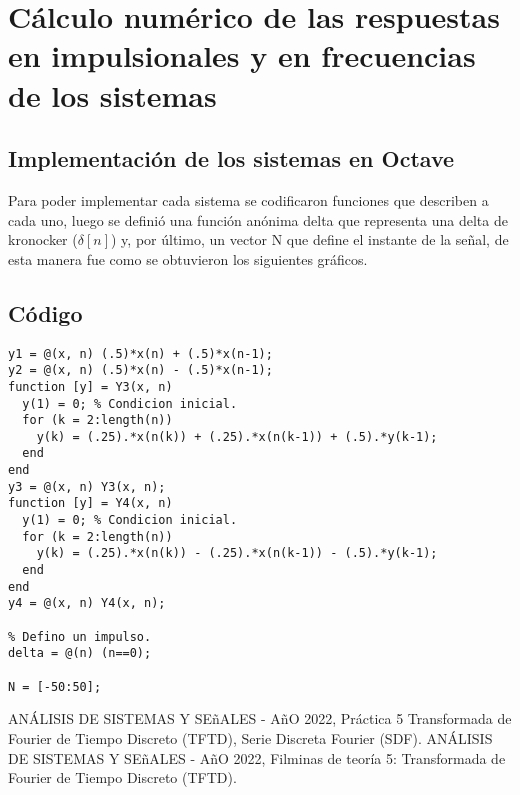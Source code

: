 \documentclass[letterpaper, 10 pt, conference]{ieeeconf}  %
\begin{document}
\section{C\'alculo num\'erico de las respuestas en impulsionales y en frecuencias de los sistemas}
\subsection{Implementaci\'on de los sistemas en Octave}
Para poder implementar cada sistema se codificaron funciones que describen a cada uno, luego se defini\'o una funci\'on an\'onima delta que representa una delta de kronocker ($\delta[n]$) y, por \'ultimo, un vector N que define el instante de la señal, de esta manera fue como se obtuvieron los siguientes gr\'aficos.

\subsection{C\'odigo}
\begin{lstlisting}[style=Matlab-editor]
y1 = @(x, n) (.5)*x(n) + (.5)*x(n-1);
y2 = @(x, n) (.5)*x(n) - (.5)*x(n-1);
function [y] = Y3(x, n)
  y(1) = 0; % Condicion inicial.
  for (k = 2:length(n))
    y(k) = (.25).*x(n(k)) + (.25).*x(n(k-1)) + (.5).*y(k-1);
  end
end
y3 = @(x, n) Y3(x, n);
function [y] = Y4(x, n)
  y(1) = 0; % Condicion inicial.
  for (k = 2:length(n))
    y(k) = (.25).*x(n(k)) - (.25).*x(n(k-1)) - (.5).*y(k-1);
  end
end
y4 = @(x, n) Y4(x, n);

% Defino un impulso.
delta = @(n) (n==0);

N = [-50:50];

\end{lstlisting}


\begin{thebibliography}{99}

ANÁLISIS DE SISTEMAS Y SE\~{n}ALES - A\~{n}O 2022, Práctica 5 Transformada de Fourier de Tiempo Discreto (TFTD), Serie Discreta Fourier (SDF).
ANÁLISIS DE SISTEMAS Y SE\~{n}ALES - A\~{n}O 2022, Filminas de teor\'ia 5: Transformada de Fourier de Tiempo Discreto (TFTD).

\end{thebibliography}
\end{document}
